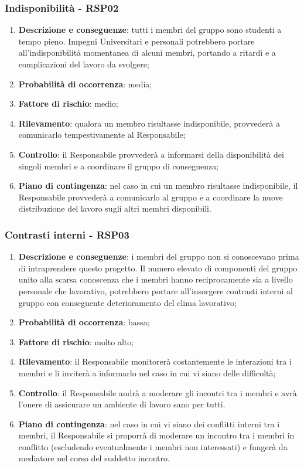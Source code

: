 	\subsubsection{Indisponibilità - RSP02}
	\begin{enumerate}
		\item \textbf{Descrizione e conseguenze}: tutti i membri del gruppo sono studenti a tempo pieno. Impegni Universitari e personali potrebbero portare all'indisponibilità momentanea di alcuni membri, portando a ritardi e a complicazioni del lavoro da svolgere; 
		\item \textbf{Probabilità di occorrenza}: media;
		\item \textbf{Fattore di rischio}: medio;
		\item \textbf{Rilevamento}: qualora un membro risultasse indisponibile, provvederà a comunicarlo tempestivamente al Responsabile;
		\item \textbf{Controllo}: il Responsabile provvederà a informarsi della disponibilità dei singoli membri e a coordinare il gruppo di conseguenza;
		\item \textbf{Piano di contingenza}: nel caso in cui un membro risultasse indisponibile, il Responsabile provvederà a comunicarlo al gruppo e a coordinare la nuove distribuzione del lavoro sugli altri membri disponibili.
	\end{enumerate}
	
	\subsubsection{Contrasti interni - RSP03}
	\begin{enumerate}
		\item \textbf{Descrizione e conseguenze}: i membri del gruppo non si conoscevano prima di intraprendere questo progetto. Il numero elevato di componenti del gruppo unito alla scarsa conoscenza che i membri hanno reciprocamente sia a livello personale che lavorativo, potrebbero portare all'insorgere contrasti interni al gruppo con conseguente deterioramento del clima lavorativo;
		\item \textbf{Probabilità di occorrenza}: bassa;
		\item \textbf{Fattore di rischio}: molto alto;
		\item \textbf{Rilevamento}: il Responsabile monitorerà costantemente le interazioni tra i membri e li inviterà a informarlo nel caso in cui vi siano delle difficoltà;
		\item \textbf{Controllo}: il Responsabile andrà a moderare gli incontri tra i membri e avrà l'onere di assicurare un ambiente di lavoro sano per tutti. 
		\item \textbf{Piano di contingenza}: nel caso in cui vi siano dei conflitti interni tra i membri, il Responsabile si proporrà di moderare un incontro tra i membri in conflitto (escludendo eventualmente i membri non interessati) e fungerà da mediatore nel corso del suddetto incontro.
	\end{enumerate}
	
